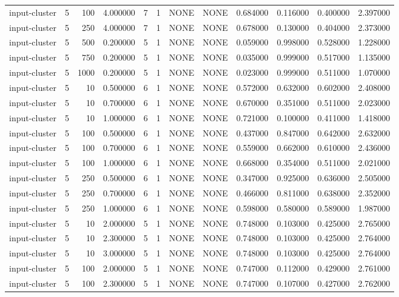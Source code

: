 \begin{tabular}{lrrrllllrrrr}
input-cluster & 5 & 100 & 4.000000 & 7 & 1 & NONE & NONE & 0.684000 & 0.116000 & 0.400000 & 2.397000 \\
input-cluster & 5 & 250 & 4.000000 & 7 & 1 & NONE & NONE & 0.678000 & 0.130000 & 0.404000 & 2.373000 \\
input-cluster & 5 & 500 & 0.200000 & 5 & 1 & NONE & NONE & 0.059000 & 0.998000 & 0.528000 & 1.228000 \\
input-cluster & 5 & 750 & 0.200000 & 5 & 1 & NONE & NONE & 0.035000 & 0.999000 & 0.517000 & 1.135000 \\
input-cluster & 5 & 1000 & 0.200000 & 5 & 1 & NONE & NONE & 0.023000 & 0.999000 & 0.511000 & 1.070000 \\
input-cluster & 5 & 10 & 0.500000 & 6 & 1 & NONE & NONE & 0.572000 & 0.632000 & 0.602000 & 2.408000 \\
input-cluster & 5 & 10 & 0.700000 & 6 & 1 & NONE & NONE & 0.670000 & 0.351000 & 0.511000 & 2.023000 \\
input-cluster & 5 & 10 & 1.000000 & 6 & 1 & NONE & NONE & 0.721000 & 0.100000 & 0.411000 & 1.418000 \\
input-cluster & 5 & 100 & 0.500000 & 6 & 1 & NONE & NONE & 0.437000 & 0.847000 & 0.642000 & 2.632000 \\
input-cluster & 5 & 100 & 0.700000 & 6 & 1 & NONE & NONE & 0.559000 & 0.662000 & 0.610000 & 2.436000 \\
input-cluster & 5 & 100 & 1.000000 & 6 & 1 & NONE & NONE & 0.668000 & 0.354000 & 0.511000 & 2.021000 \\
input-cluster & 5 & 250 & 0.500000 & 6 & 1 & NONE & NONE & 0.347000 & 0.925000 & 0.636000 & 2.505000 \\
input-cluster & 5 & 250 & 0.700000 & 6 & 1 & NONE & NONE & 0.466000 & 0.811000 & 0.638000 & 2.352000 \\
input-cluster & 5 & 250 & 1.000000 & 6 & 1 & NONE & NONE & 0.598000 & 0.580000 & 0.589000 & 1.987000 \\
input-cluster & 5 & 10 & 2.000000 & 5 & 1 & NONE & NONE & 0.748000 & 0.103000 & 0.425000 & 2.765000 \\
input-cluster & 5 & 10 & 2.300000 & 5 & 1 & NONE & NONE & 0.748000 & 0.103000 & 0.425000 & 2.764000 \\
input-cluster & 5 & 10 & 3.000000 & 5 & 1 & NONE & NONE & 0.748000 & 0.103000 & 0.425000 & 2.764000 \\
input-cluster & 5 & 100 & 2.000000 & 5 & 1 & NONE & NONE & 0.747000 & 0.112000 & 0.429000 & 2.761000 \\
input-cluster & 5 & 100 & 2.300000 & 5 & 1 & NONE & NONE & 0.747000 & 0.107000 & 0.427000 & 2.762000 \\

\end{tabular}
